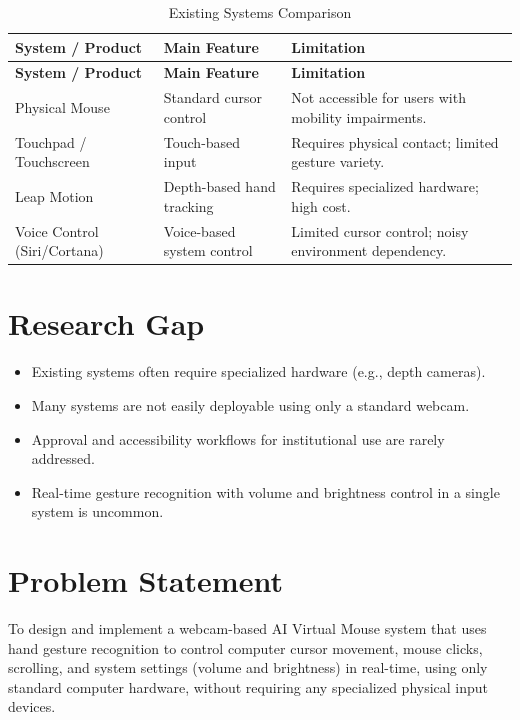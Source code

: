 \documentclass[12pt,a4paper]{report}
\begin{document}
\begin{longtable}{p{3.5cm} p{4cm} p{5cm}}
\caption{Existing Systems Comparison} \label{tab:existing} \\
\toprule
\textbf{System / Product} & \textbf{Main Feature} & \textbf{Limitation} \\
\midrule
\endfirsthead
\toprule
\textbf{System / Product} & \textbf{Main Feature} & \textbf{Limitation} \\
\midrule
\endhead
\bottomrule
\endfoot
Physical Mouse & Standard cursor control & Not accessible for users with mobility impairments. \\[4pt]
Touchpad / Touchscreen & Touch-based input & Requires physical contact; limited gesture variety. \\[4pt]
Leap Motion & Depth-based hand tracking & Requires specialized hardware; high cost. \\[4pt]
Voice Control (Siri/Cortana) & Voice-based system control & Limited cursor control; noisy environment dependency. \\
\end{longtable}

\section{Research Gap}

\begin{itemize}[noitemsep]
  \item Existing systems often require specialized hardware (e.g., depth cameras).
  \item Many systems are not easily deployable using only a standard webcam.
  \item Approval and accessibility workflows for institutional use are rarely addressed.
  \item Real-time gesture recognition with volume and brightness control in a single system is uncommon.
\end{itemize}

\section{Problem Statement}

To design and implement a webcam-based AI Virtual Mouse system that uses hand gesture recognition
to control computer cursor movement, mouse clicks, scrolling, and system settings (volume and
brightness) in real-time, using only standard computer hardware, without requiring any specialized
physical input devices.
\end{document}
